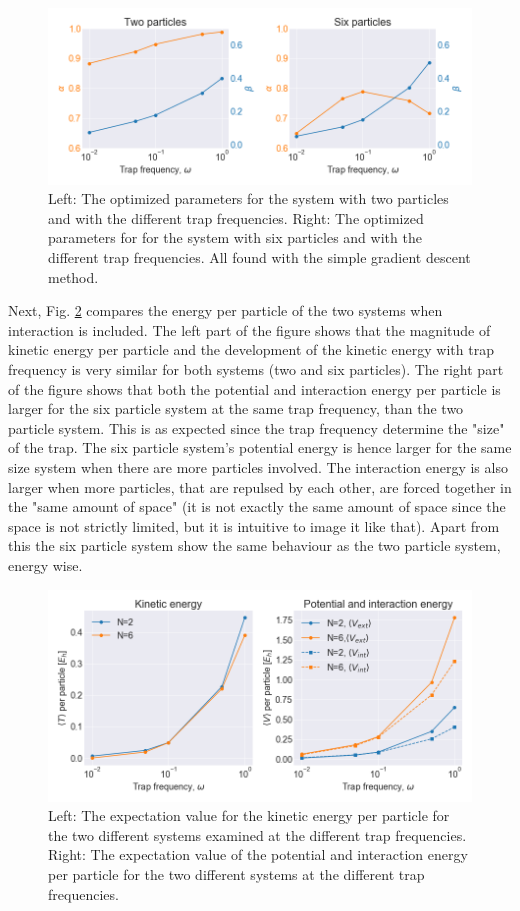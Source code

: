 \begin{figure}[H]
\center
\includegraphics[width=0.85\linewidth]{../Results/parameters_compared}\caption{Left: The optimized parameters for the system with two particles and with the different trap frequencies. Right: The optimized parameters for  for the system with six particles and with the different trap frequencies. All found with the simple gradient descent method.}\label{fig:parameters_compared}
\end{figure}

Next, Fig. \ref{fig:energy_per_particle_compared} compares the energy per particle of the two systems when interaction is included. The left part of the figure shows that the magnitude of kinetic energy per particle and the development of the kinetic energy with trap frequency is very similar for both systems (two and six particles). The right part of the figure shows that both the potential and interaction energy per particle is larger for the six particle system at the same trap frequency, than the two particle system. This is as expected since the trap frequency determine the "size" of the trap. The six particle system's potential energy is hence larger for the same size system when there are more particles involved. The interaction energy is also larger when more particles, that are repulsed by each other, are forced together in the "same amount of space" (it is not exactly the same amount of space since the space is not strictly limited, but it is intuitive to image it like that). Apart from this the six particle system show the same behaviour as the two particle system, energy wise. 

\begin{figure}[H]
\center
\includegraphics[width=0.85\linewidth]{../Results/energy_per_particle_compared}\caption{Left: The expectation value for the kinetic energy per particle for the two different systems examined at the different trap frequencies. Right: The expectation value of the potential and interaction energy per particle for the two different systems at the different trap frequencies.  }\label{fig:energy_per_particle_compared}
\end{figure}



